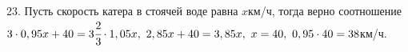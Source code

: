23. Пусть скорость катера в стоячей воде равна $x$км/ч, тогда верно соотношение $3\cdot0,95x+40=3\cfrac{2}{3}\cdot1,05x,\
2,85x+40=3,85x,\ x=40,\ 0,95\cdot40=38$км/ч.\\

